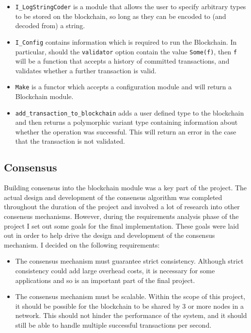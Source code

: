 \documentclass[12pt,a4paper,twoside,openright]{report}
\begin{document}
	\begin{itemize}
		\item \texttt{I\_LogStringCoder} is a module that allows the user to specify arbitrary types to be stored on the blockchain, so long as they can be encoded to (and decoded from) a string.
		\item \texttt{I\_Config} contains information which is required to run the Blockchain.
			In particular, should the \texttt{validator} option contain the value \texttt{Some(f)}, then \texttt{f} will be a function that accepts a history of committed transactions, and validates whether a further transaction is valid. 
		\item \texttt{Make} is a functor which accepts a configuration module and will return a Blockchain module.
		\item \texttt{add\_transaction\_to\_blockchain} adds a user defined type to the blockchain and then returns a polymorphic variant type containing information about whether the operation was successful. 
			This will return an error in the case that the transaction is not validated.
	\end{itemize} 

	\subsection{Consensus}
	Building consensus into the blockchain module was a key part of the project. 
	The actual design and development of the consensus algorithm was completed throughout the duration of the project and involved a lot of research into other consensus mechanisms.
	However, during the requirements analysis phase of the project I set out some goals for the final implementation.
	These goals were laid out in order to help drive the design and development of the consensus mechanism. 
	I decided on the following requirements:
	\begin{itemize}
		\item The consensus mechanism must guarantee strict consistency. Although strict consistency could add large overhead costs, it is necessary for some applications and so is an important part of the final project.
		\item The consensus mechanism must be scalable. Within the scope of this project, it should be possible for the blockchain to be shared by 3 or more nodes in a network. This should not hinder the performance of the system, and it should still be able to handle multiple successful transactions per second.
	\end{itemize}
\end{document}
